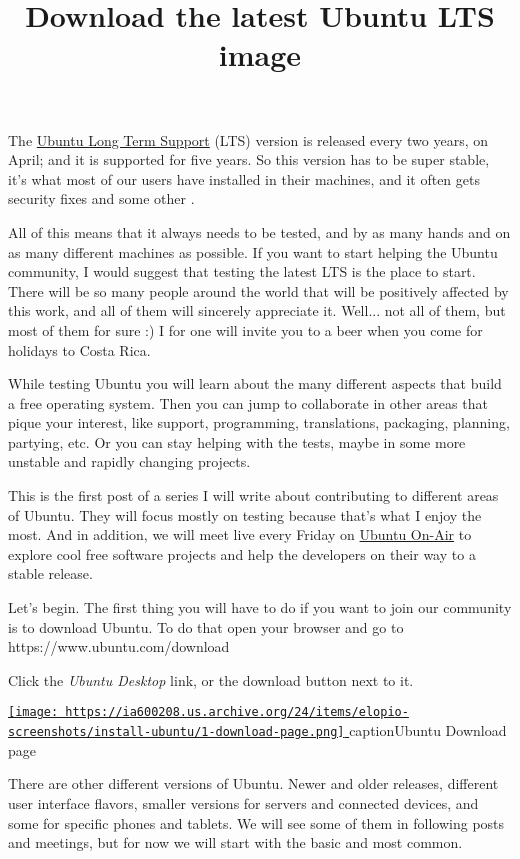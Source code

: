 \documentclass[12pt]{article}
\title{Download the latest Ubuntu LTS image}
\begin{document}
The \href{https://wiki.ubuntu.com/LTS}{Ubuntu Long Term Support} (LTS) version
is released every two years, on April; and it is supported for five years. So
this version has to be super stable, it's what most of our users have installed
in their machines, and it often gets security fixes and some other
.

All of this means that it always needs to be tested, and by as many hands and on
as many different machines as possible. If you want to start helping the Ubuntu
community, I would suggest that testing the latest LTS is the place to start.
There will be so many people around the world that will be positively affected
by this work, and all of them will sincerely appreciate it. Well... not all of
them, but most of them for sure :) I for one will invite you to a beer when you
come for holidays to Costa Rica.

While testing Ubuntu you will learn about the many different aspects that build
a free operating system. Then you can jump to collaborate in other areas that
pique your interest, like support, programming, translations, packaging,
planning, partying, etc. Or you can stay helping with the tests, maybe in some
more unstable and rapidly changing projects.

This is the first post of a series I will write about contributing to different
areas of Ubuntu. They will focus mostly on testing because that's what I enjoy
the most. And in addition, we will meet live every Friday on
\href{http://ubuntuonair.com/}{Ubuntu On-Air} to explore cool free software
projects and help the developers on their way to a stable release.

Let's begin. The first thing you will have to do if you want to join our
community is to download Ubuntu. To do that open your browser and go to
https://www.ubuntu.com/download

Click the \emph{Ubuntu Desktop} link, or the download button next to it.

\begin{center}
  \href{
    https://ia600208.us.archive.org/24/items/elopio-screenshots/install-ubuntu/1-download-page.png}{
    \texttt{[image: 
    https://ia600208.us.archive.org/24/items/elopio-screenshots/install-ubuntu/1-download-page.png]}
  }
  caption{Ubuntu Download page}
\end{center}

There are other different versions of Ubuntu. Newer and older releases,
different user interface flavors, smaller versions for servers and connected
devices, and some for specific phones and tablets. We will see some of them
in following posts and meetings, but for now we will start with the basic and
most common.
\end{document}

